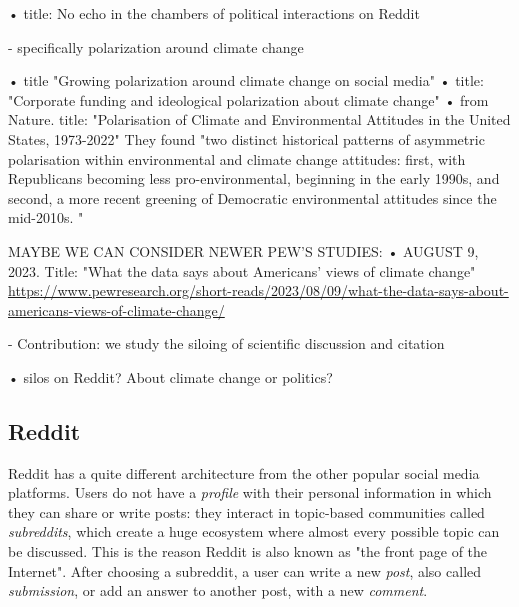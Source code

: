 \begin{itemize}
• \cite{de2021no} title: No echo in the chambers of political interactions on Reddit



- specifically polarization around climate change

• \cite{falkenberg2022growing} title "Growing polarization around climate change on social media" 
• \cite{farrell2016corporate} title: "Corporate funding and ideological polarization about climate change"
• \cite{smith2024polarisation} from Nature. title: "Polarisation of Climate and Environmental Attitudes in the United States, 1973-2022" They found "two distinct historical patterns of asymmetric polarisation within environmental and climate change attitudes: first, with Republicans becoming less pro-environmental, beginning in the early 1990s, and second, a more recent greening of Democratic environmental attitudes since the mid-2010s. "




MAYBE WE CAN CONSIDER NEWER PEW'S STUDIES:
• AUGUST 9, 2023. Title: "What the data says about Americans’ views of climate change" \url{https://www.pewresearch.org/short-reads/2023/08/09/what-the-data-says-about-americans-views-of-climate-change/} 


- Contribution: we study the siloing of scientific discussion and citation

• silos on Reddit? About climate change or politics?

\end{itemize}









\subsection{Reddit}
Reddit has a quite different architecture from the other popular social media platforms. Users do not have a \emph{profile} with their personal information in which they can share or write posts: they interact in topic-based communities called \emph{subreddits}, which create a huge ecosystem where almost every possible topic can be discussed. This is the reason Reddit is also known as "the front page of the Internet". After choosing a subreddit, a user can write a new  \emph{post}, also called \emph{submission}, or add an answer to another post, with a new \emph{comment}. \\


